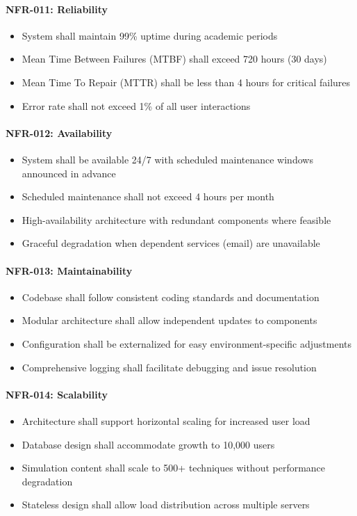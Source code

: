 \documentclass[12pt,a4paper]{article}
\begin{document}
\begin{enumerate}
\paragraph{NFR-011: Reliability}
\begin{itemize}
    \item System shall maintain 99\% uptime during academic periods
    \item Mean Time Between Failures (MTBF) shall exceed 720 hours (30 days)
    \item Mean Time To Repair (MTTR) shall be less than 4 hours for critical failures
    \item Error rate shall not exceed 1\% of all user interactions
\end{itemize}

\paragraph{NFR-012: Availability}
\begin{itemize}
    \item System shall be available 24/7 with scheduled maintenance windows announced in advance
    \item Scheduled maintenance shall not exceed 4 hours per month
    \item High-availability architecture with redundant components where feasible
    \item Graceful degradation when dependent services (email) are unavailable
\end{itemize}

\paragraph{NFR-013: Maintainability}
\begin{itemize}
    \item Codebase shall follow consistent coding standards and documentation
    \item Modular architecture shall allow independent updates to components
    \item Configuration shall be externalized for easy environment-specific adjustments
    \item Comprehensive logging shall facilitate debugging and issue resolution
\end{itemize}

\paragraph{NFR-014: Scalability}
\begin{itemize}
    \item Architecture shall support horizontal scaling for increased user load
    \item Database design shall accommodate growth to 10,000 users
    \item Simulation content shall scale to 500+ techniques without performance degradation
    \item Stateless design shall allow load distribution across multiple servers
\end{itemize}


\end{enumerate}
\end{document}
